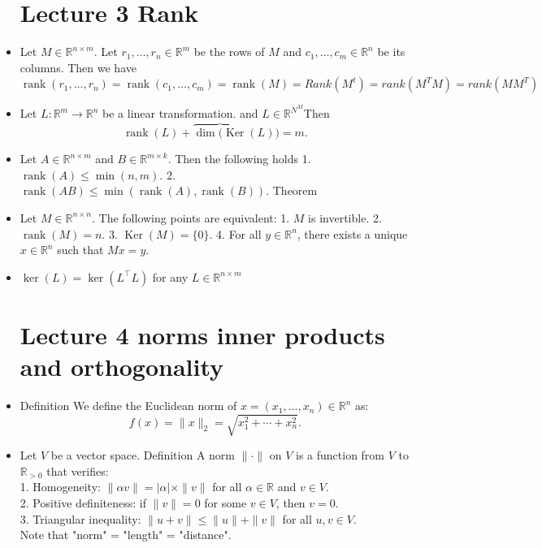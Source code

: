 \documentclass[12pt,twoside]{article}
\begin{document}
\begin{itemize}
\section{Lecture 3 Rank }
\item {} Let $M \in \mathbb{R}^{n \times m}$. Let $r_1, \ldots, r_n \in \mathbb{R}^m$ be the rows of $M$ and $c_1, \ldots, c_m \in \mathbb{R}^n$ be its columns. Then we have
$
\operatorname{rank}\left(r_1, \ldots, r_n\right)=\operatorname{rank}\left(c_1, \ldots, c_m\right)=\operatorname{rank}(M)= Rank(M^t)=rank(M^TM)=rank(MM^T)
$

\item {} Let $L: \mathbb{R}^m \rightarrow \mathbb{R}^n$ be a linear transformation. and $L\in\mathbb{R}^{N^M}$Then 
$$
\operatorname{rank}(L)+\overbrace{\operatorname{dim}(\operatorname{Ker}}(L))=m .
$$
\item {} Let $A \in \mathbb{R}^{n \times m}$ and $B \in \mathbb{R}^{m \times k}$. Then the following holds
1. $\operatorname{rank}(A) \leq \min (n, m)$.
2. $\operatorname{rank}(A B) \leq \min (\operatorname{rank}(A), \operatorname{rank}(B))$.
Theorem
\item {}
Let $M \in \mathbb{R}^{n \times n}$. The following points are equivalent:
1. $M$ is invertible.
2. $\operatorname{rank}(M)=n$.
3. $\operatorname{Ker}(M)=\{0\}$.
4. For all $y \in \mathbb{R}^n$, there exists a unique $x \in \mathbb{R}^n$ such that $M x=y$.
\item $\operatorname{ker}(L)=\operatorname{ker}\left(L^{\top} L\right)$ for any $L \in \mathbb{R}^{n \times m}$
\section{Lecture 4 norms inner products and orthogonality}
\item {} Definition
We define the Euclidean norm of $x=\left(x_1, \ldots, x_n\right) \in \mathbb{R}^n$ as:
$$
f(x)=\|x\|_2=\sqrt{x_1^2+\cdots+x_n^2} .
$$
\item {}
Let $V$ be a vector space.
Definition A norm $\|\cdot\|$ on $V$ is a function from $V$ to $\mathbb{R}_{>0}$ that verifies:
\\1. Homogeneity: $\|\alpha v\|=|\alpha| \times\|v\|$ for all $\alpha \in \mathbb{R}$ and $v \in V$.
\\ 2. Positive definiteness: if $\|v\|=0$ for some $v \in V$, then $v=0$.
\\ 3. Triangular inequality: $\|u+v\| \leq\|u\|+\|v\|$ for all $u, v \in V$.
\\Note that "norm" = "length" = "distance".


\end{itemize}
\end{document}
